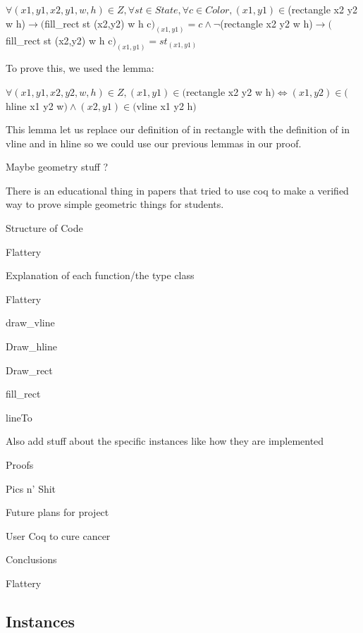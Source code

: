 \documentclass{llncs}
\begin{document}
\begin {theorem} 
$\forall (x1,y1,x2,y1,w,h) \in Z, \forall st \in State, \forall c \in Color, (x1,y1) \in $(rectangle x2 y2 w h)$ \rightarrow ($fill\_rect st (x2,y2) w h c$)_{(x1,y1)} = c \land \neg $(rectangle x2 y2 w h)$ \rightarrow ($fill\_rect st (x2,y2) w h c$)_{(x1,y1)} = st_{(x1,y1)}$
\end {theorem}

To prove this, we used the lemma:

\begin {lemma} 
$\forall (x1,y1,x2,y2,w,h) \in Z, (x1,y1) \in ($rectangle x2 y2 w h$) \iff (x1,y2) \in ($hline x1 y2 w$) \land (x2,y1) \in ($vline x1 y2 h$) $
\end {lemma}

This lemma let us replace our definition of in rectangle with the definition of in vline and in hline so we could use our previous lemmas in our proof.


Maybe geometry stuff ? 

There is an educational thing in papers that tried to use coq to make a verified way to prove simple geometric things for students.

Structure of Code

Flattery

Explanation of each function/the type class

Flattery

draw\_vline

Draw\_hline

Draw\_rect

fill\_rect

lineTo

Also add stuff about the specific instances like how they are implemented

Proofs

Pics n’ Shit 

Future plans for project

User Coq to cure cancer 

Conclusions

Flattery


\subsection{Instances}
\end{document}
